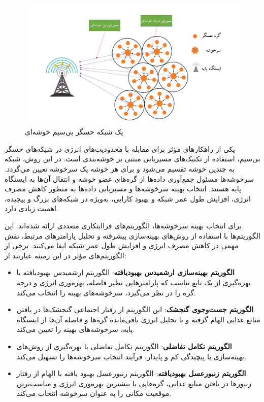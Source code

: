 \documentclass[12pt, onecolumn, a4paper]{article}
\begin{document}
	\begin{figure}[h]
		\centering
		\includegraphics[width=\textwidth]{cluster-persian.png}
		\caption{یک شبکه حسگر بی‌سیم خوشه‌ای}
		\label{fig:your_label}
	\end{figure}
	
	یکی از راهکارهای مؤثر برای مقابله با محدودیت‌های انرژی در شبکه‌های حسگر بی‌سیم، استفاده از تکنیک‌های مسیریابی مبتنی بر خوشه‌بندی است. در این روش، شبکه به چندین خوشه تقسیم می‌شود و برای هر خوشه یک سرخوشه تعیین می‌گردد. سرخوشه‌ها مسئول جمع‌آوری داده‌ها از گره‌های عضو خوشه و انتقال آن‌ها به ایستگاه پایه هستند. انتخاب بهینه سرخوشه‌ها و مسیریابی داده‌ها به منظور کاهش مصرف انرژی، افزایش طول عمر شبکه و بهبود کارایی، به‌ویژه در شبکه‌های بزرگ و پیچیده، اهمیت زیادی دارد\cite{ref6}.
	
	برای انتخاب بهینه سرخوشه‌ها، الگوریتم‌های فراابتکاری متعددی ارائه شده‌اند. این الگوریتم‌ها با استفاده از روش‌های بهینه‌سازی پیشرفته و تحلیل پارامترهای مرتبط، نقش مهمی در کاهش مصرف انرژی و افزایش طول عمر شبکه ایفا می‌کنند. برخی از الگوریتم‌های مؤثر در این زمینه عبارتند از:
	
	\begin{itemize}
		\item \textbf{الگوریتم بهینه‌سازی ارشمیدس بهبودیافته}:  الگوریتم ارشمیدس بهبودیافته با بهره‌گیری از یک تابع تناسب که پارامترهایی نظیر فاصله، بهره‌وری انرژی و درجه گره را در نظر می‌گیرد، سرخوشه‌های بهینه را انتخاب می‌کند.
		\item \textbf{الگوریتم جست‌وجوی گنجشک}: این الگوریتم از رفتار اجتماعی گنجشک‌ها در یافتن منابع غذایی الهام گرفته و با تحلیل انرژی باقی‌مانده گره‌ها و فاصله آن‌ها از ایستگاه پایه، سرخوشه‌های بهینه را تعیین می‌کند.
		\item \textbf{الگوریتم تکامل تفاضلی}: الگوریتم  تکامل تفاضلی با بهره‌گیری از روش‌های بهینه‌سازی با پیچیدگی کم و پایدار، فرآیند انتخاب سرخوشه‌ها را تسهیل می‌کند.
		\item \textbf{الگوریتم زنبورعسل بهبودیافته}: الگوریتم زنبورعسل بهبود یافته با الهام از رفتار زنبورها در یافتن منابع غذایی، گره‌هایی با بیشترین بهره‌وری انرژی و مناسب‌ترین موقعیت مکانی را به عنوان سرخوشه انتخاب می‌کند.
	\end{itemize}
	
\end{document}
